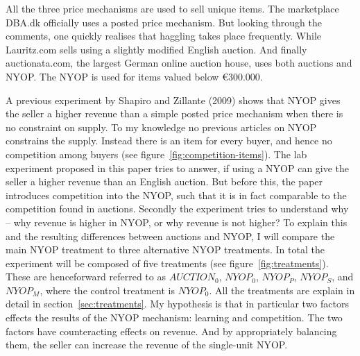 \documentclass[a4paper,12pt]{article}
\begin{document}
	All the three price mechanisms are used to sell unique items. The marketplace DBA.dk officially uses a posted price mechanism. But looking through the comments, one quickly realises that haggling takes place frequently. While Lauritz.com sells using a slightly modified English auction. And finally auctionata.com, the largest German online auction house, uses both auctions and NYOP. The NYOP is used for items valued below \euro300.000. %
	
	A previous experiment by Shapiro and Zillante (2009) shows that NYOP gives the seller a higher revenue than a simple posted price mechanism when there is no constraint on supply. To my knowledge no previous articles on NYOP constrains the supply. Instead there is an item for every buyer, and hence no competition among buyers (see figure~\ref{fig:competition-items}). The lab experiment proposed in this paper tries to answer, if using a NYOP can give the seller a higher revenue than an English auction. But before this, the paper introduces competition into the NYOP, such that it is in fact comparable to the competition found in auctions.  Secondly the experiment tries to understand why -- why revenue is higher in NYOP, or why revenue is not higher? To explain this and the resulting differences between auctions and NYOP, I will compare the main NYOP treatment to three alternative NYOP treatments. In total the experiment will be composed of five treatments (see figure~\ref{fig:treatments}). These are henceforward referred to as $AUCTION_0$, $NYOP_0$, $NYOP_P$, $NYOP_S$, and $NYOP_M$, where the control treatment is $NYOP_0$. All the treatments are explain in detail in section~\ref{sec:treatments}. My hypothesis is that in particular two factors effects the results of the NYOP mechanism: learning and competition. The two factors have counteracting effects on revenue. And by appropriately balancing them, the seller can increase the revenue of the single-unit NYOP. 
\end{document}
